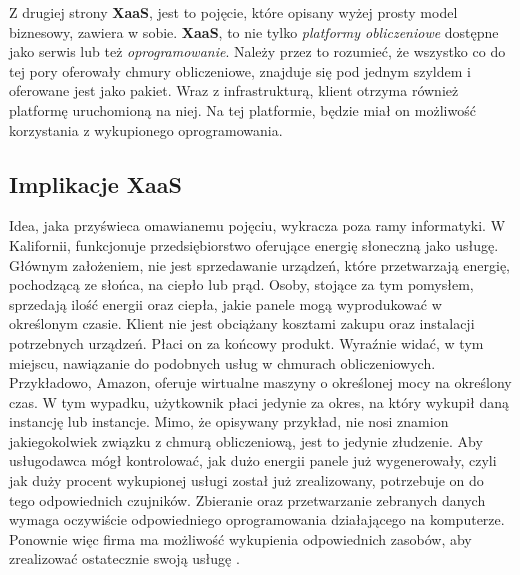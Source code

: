 Z drugiej strony \textbf{XaaS}, jest to pojęcie, które
opisany wyżej prosty model biznesowy, zawiera w sobie. \textbf{XaaS}, to nie tylko \textit{platformy obliczeniowe} dostępne jako serwis lub też \textit{oprogramowanie}.
Należy przez to rozumieć, że wszystko co do tej pory oferowały chmury obliczeniowe, znajduje się pod jednym szyldem i oferowane jest jako pakiet. 
Wraz z infrastrukturą, klient otrzyma również platformę uruchomioną na niej. Na tej platformie, będzie miał on możliwość korzystania z wykupionego oprogramowania.

\subsection{Implikacje XaaS}
Idea, jaka przyświeca omawianemu pojęciu, wykracza poza ramy informatyki. W Kalifornii, funkcjonuje
przedsiębiorstwo oferujące energię słoneczną jako usługę. Głównym założeniem, nie jest sprzedawanie
urządzeń, które przetwarzają energię, pochodzącą ze słońca, na ciepło lub prąd. Osoby, stojące za tym pomysłem, sprzedają ilość energii oraz ciepła, jakie 
panele mogą wyprodukować w określonym czasie. Klient nie jest obciążany kosztami zakupu oraz instalacji
potrzebnych urządzeń. Płaci on za końcowy produkt. Wyraźnie widać, w tym miejscu, nawiązanie do 
podobnych usług w chmurach obliczeniowych. Przykładowo, Amazon, oferuje wirtualne maszyny o określonej mocy na określony czas. W tym wypadku, 
użytkownik płaci jedynie za okres, na który wykupił daną instancję lub instancje. Mimo, że opisywany przykład,
nie nosi znamion jakiegokolwiek związku z chmurą obliczeniową, jest to jedynie złudzenie. Aby usługodawca mógł kontrolować, jak dużo energii panele
już wygenerowały, czyli jak duży procent wykupionej usługi został już zrealizowany, potrzebuje on do tego odpowiednich czujników. Zbieranie oraz
przetwarzanie zebranych danych wymaga oczywiście odpowiedniego oprogramowania działającego na komputerze. Ponownie więc firma ma możliwość
wykupienia odpowiednich zasobów, aby zrealizować ostatecznie swoją usługę \cite{linkedin_anything_as_a_service}. 